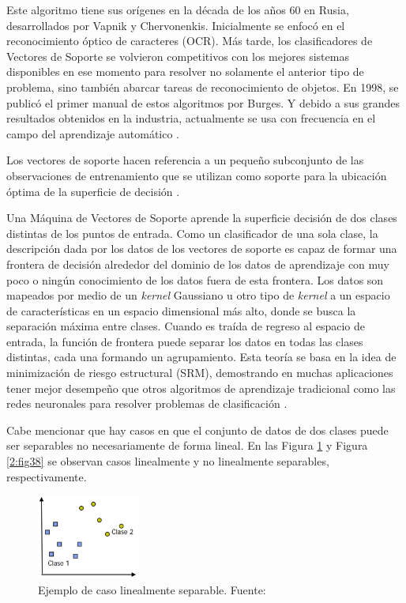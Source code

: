 \begin{itemize}
	Este algoritmo tiene sus orígenes en la década de los años 60 en Rusia, desarrollados por Vapnik y Chervonenkis. Inicialmente se enfocó en el reconocimiento óptico de caracteres (OCR). Más tarde, los clasificadores de Vectores de Soporte se volvieron competitivos con los mejores sistemas disponibles en ese momento para resolver no solamente el anterior tipo de problema, sino también abarcar tareas de reconocimiento de objetos. En 1998, se publicó el primer manual de estos algoritmos por Burges. Y debido a sus grandes resultados obtenidos en la industria, actualmente se usa con frecuencia en el campo del aprendizaje automático \parencite{tec_smola2004svm}.
	
	Los vectores de soporte hacen referencia a un pequeño subconjunto de las observaciones de entrenamiento que se utilizan como soporte para la ubicación óptima de la superficie de decisión \parencite{gl_mathworks_svm}.
	
	Una Máquina de Vectores de Soporte aprende la superficie decisión de dos clases distintas de los puntos de entrada. Como un clasificador de una sola clase, la descripción dada por los datos de los vectores de soporte es capaz de formar una frontera de decisión alrededor del dominio de los datos de aprendizaje con muy poco o ningún conocimiento de los datos fuera de esta frontera. Los datos son mapeados por medio de un \textit{kernel} Gaussiano u otro tipo de \textit{kernel} a un espacio de características en un espacio dimensional más alto, donde se busca la separación máxima entre clases. Cuando es traída de regreso al espacio de entrada, la función de frontera puede separar los datos en todas las clases distintas, cada una formando un agrupamiento. Esta teoría se basa en la idea de minimización de riesgo estructural (SRM), demostrando en muchas aplicaciones tener mejor desempeño que otros algoritmos de aprendizaje tradicional como las redes neuronales para resolver problemas de clasificación \parencite{tec_betancourt2005svm}.
	
	Cabe mencionar que hay casos en que el conjunto de datos de dos clases puede ser separables no necesariamente de forma lineal. En las Figura \ref{2:fig37} y Figura \ref{2:fig38} se observan casos linealmente y no linealmente separables, respectivamente.
	\begin{figure}[htbp]
		\begin{center}
			\includegraphics[width=0.3\textwidth]{2/figures/caso1_svm.jpg}
			\caption{Ejemplo de caso linealmente separable. Fuente: \cite{tec_betancourt2005svm}}
			\label{2:fig37}
			

\end{center}
\end{figure}
\end{itemize}

